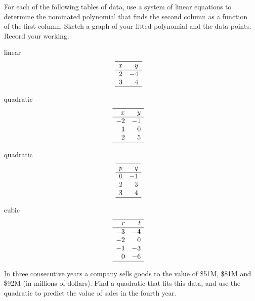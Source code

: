 \begin{exercise} \label{ex:} 
For each of the following tables of data, use a system of linear equations to determine the nominated polynomial that finds the second column as a function of the first column.
Sketch a graph of your fitted polynomial and the data points.
Record your working.
\begin{parts}
\item linear \[\begin{array}{rr}\hline
x&y\\\hline
2&-4\\
3&4\\\hline
\end{array}\]

\item quadratic \[\begin{array}{rr}\hline
x&y\\\hline
-2&-1\\
1&0\\
2&5\\\hline
\end{array}\]

\item quadratic \[\begin{array}{rr}\hline
p&q\\\hline
0&-1\\
2&3\\
3&4\\\hline
\end{array}\]

\item cubic \[\begin{array}{rr}\hline
r&t\\\hline
-3&-4\\
-2&0\\
-1&-3\\
0&-6\\\hline
\end{array}\]

\end{parts}
\end{exercise}




\begin{exercise} \label{ex:} 
In three consecutive years a company sells goods to the value of \$51M, \$81M and \$92M (in millions of dollars).
Find a quadratic that fits this data, and use the quadratic to predict the value of sales in the fourth year.
\end{exercise}




